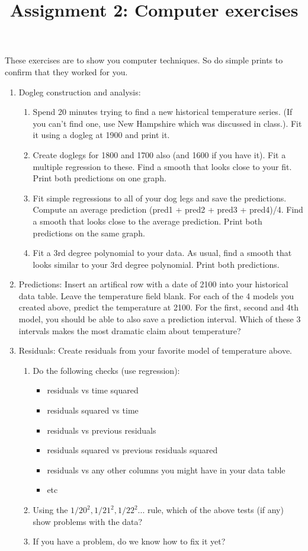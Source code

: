 \documentclass[11pt]{article}
\begin{document}
\title{Assignment 2: Computer exercises}

These exercises are to show you computer techniques.  So do simple
 prints to confirm that they worked for you.

\begin{enumerate}
\item Dogleg construction and analysis:
\begin{enumerate}
\item Spend 20 minutes trying to find a new historical temperature
series.  (If you can't find one, use New Hampshire which was discussed
in class.).   Fit it using a dogleg at 1900 and print it.
\item Create doglegs for 1800 and 1700 also (and 1600 if you have
it).  Fit a multiple regression to these.  Find a smooth that looks
close to your fit.  Print both predictions on one graph. 
\item Fit simple regressions to all of your dog legs and save the
predictions.  Compute an average prediction (pred1 + pred2 + pred3 +
pred4)/4.  Find a smooth that looks close to the average prediction.
Print both predictions on the same graph.
\item Fit a 3rd degree polynomial to your data.  As usual, find a
smooth that looks similar to your 3rd degree polynomial.  Print both
predictions. 
\end{enumerate}

\item Predictions: Insert an artifical row with a date of 2100 into
your historical data table.  Leave the temperature field blank.  For
each of the 4 models you created above, predict the temperature at
2100.   For the first, second and 4th model, you should be able to
also save a prediction interval.  Which of these 3 intervals makes the
most dramatic claim about temperature?

\item Residuals: Create residuals from your favorite model of
temperature above.  
\begin{enumerate}
\item Do the following checks (use regression):
\begin{itemize}
\item residuals vs time squared
\item residuals squared vs time
\item residuals vs previous residuals
\item residuals squared vs previous residuals squared
\item residuals vs any other columns you might have in your data table
\item etc
\end{itemize}
\item Using the $1/20^2, 1/21^2, 1/22^2$... rule, which of the
above tests (if any) show problems with the data? 
\item If you have a problem, do we know how to fix it yet?
\end{enumerate}


\end{enumerate}
\end{document}
